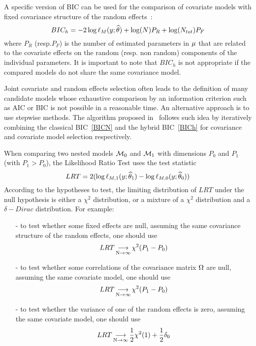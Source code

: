 A specific version of BIC can be used for the comparison of covariate models with fixed covariance structure of the random effects~\cite{DelattrePoursatLavielle2014}:
\begin{equation} 
BIC_h =- 2 \log \ell_M(y;{\widehat{\theta}}) + \log(N) P_R + \log(N_{tot}) P_F \label{BICh}
\end{equation}
where $P_R$ (resp.$P_F$) is the number of estimated parameters in $\fixed_effect$ that are related to the covariate effects on the random (resp. non random) components of the individual parameters. It is important to note that $BIC_h$ is not appropriate if the compared models do not share the same covariance model.  

Joint covariate and random effects selection often leads to the definition of many candidate models whose exhaustive comparison by an information criterion such as AIC or BIC is not possible in a reasonable time. An alternative approach is to use stepwise methods. The algorithm proposed in~\cite{DelattrePoursat2020} follows such idea by iteratively combining the classical BIC~\eqref{BICN} and the hybrid BIC~\eqref{BICh} for covariance and covariate model selection respectively.
 
When comparing two nested models ${\cal M}_0$ and ${\cal M}_1$ with dimensions $P_0$ and $P_1$ (with $P_1>P_0$), the Likelihood Ratio Test uses the test statistic 
$$LRT = 2 ( \log \ell_{M,1}(y;{\widehat{\theta}}_1) -  \log \ell_{M,0}(y;{\widehat{\theta}}_0) )$$
According to the hypotheses to test, the limiting distribution of $LRT$ under the null hypothesis is either a $\chi ^2$ distribution, or a mixture of a $\chi^2$ distribution and a
$\delta-Dirac$ distribution. For example:
\begin{itemize}
	\item[-] to test whether some fixed effects are null, assuming the same covariance structure of the random effects, one should use
	$$LRT \mathop{\longrightarrow}\limits_{\mathrm{N\to \infty}}^{\mathrm{}} \chi^2(P_1-P_0) $$
	\item[-] to test whether some correlations of the covariance matrix ${\Omega}$ are null, assuming the same covariate model, one should use 
	$$LRT \mathop{\longrightarrow}\limits_{\mathrm{N\to \infty}}^{\mathrm{}} \chi^2(P_1-P_0) $$
	\item[-] to test whether the variance of one of the random effects is zero, assuming the same covariate model, one should use
	$$LRT \mathop{\longrightarrow}\limits_{\mathrm{N\to \infty}}^{\mathrm{}} \frac{1}{2} \chi^2(1) + \frac{1}{2}\delta_0 $$
\end{itemize}



